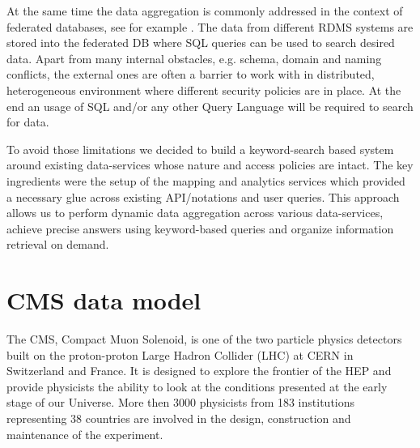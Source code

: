 \documentclass[1p,times]{elsarticle}
\begin{document}
At the same time the data aggregation is commonly addressed in the context of
federated databases, see for example \cite{FedDB}. The data from different 
RDMS systems are stored into the federated DB where SQL queries can be used to 
search desired data. Apart from many internal obstacles, e.g.
schema, domain and naming conflicts, the external ones are often
a barrier to work with in distributed, heterogeneous environment where
different security policies are in place. At the end an usage of SQL and/or
any other Query Language will be required to search for data.

To avoid those limitations we decided to build a keyword-search based system around
existing data-services whose nature and access policies are intact.
The key ingredients were the setup of the mapping and analytics services which provided
a necessary glue across existing API/notations and user queries. This approach 
allows us to perform dynamic data aggregation across various data-services, achieve
precise answers using keyword-based queries
and organize information retrieval on demand.

\section{CMS data model\label{DataModel}}
The CMS, Compact Muon Solenoid, \cite{CMS} 
is one of the two particle physics detectors built on 
the proton-proton Large Hadron Collider (LHC) at CERN in Switzerland and France. 
It is designed to explore the frontier of the HEP and provide physicists
the ability to look at the conditions presented at the early stage of our Universe.
More then 3000 physicists from 183 institutions representing 38 countries 
are involved in the design, construction and maintenance of the experiment.
\end{document}
